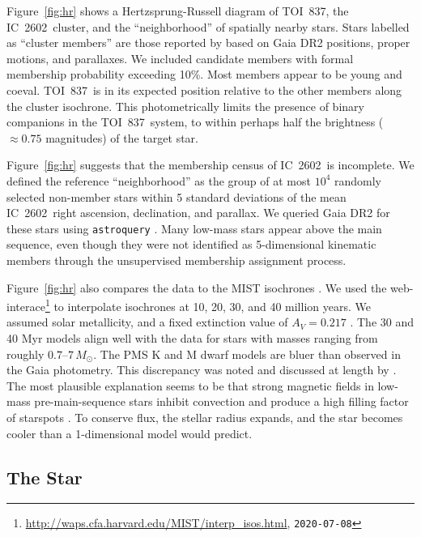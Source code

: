\documentclass[12pt,twocolumn,tighten]{aastex63}
\newcommand{\tn}{TOI~837} %
\newcommand{\cn}{IC~2602} %
\begin{document}
Figure~\ref{fig:hr} shows a Hertzsprung-Russell diagram of \tn, the
\cn\ cluster, and the ``neighborhood'' of spatially nearby stars.
Stars labelled as ``cluster members'' are those reported by
\citet{cantatgaudin_gaia_2018} based on Gaia DR2 positions, proper
motions, and parallaxes.  We included candidate members with formal
membership probability exceeding 10\%.  Most members appear to be
young and coeval.  \tn\ is in its expected position relative to the
other members along the cluster isochrone.  This photometrically
limits the presence of binary companions in the \tn\ system, to within
perhaps half the brightness ($\approx0.75$ magnitudes) of the target
star.

Figure~\ref{fig:hr} suggests that the membership census of \cn\ is
incomplete.  We defined the reference ``neighborhood'' as the group of
at most $10^4$ randomly selected non-member stars within 5 standard
deviations of the mean \cn\ right ascension, declination, and
parallax.  We queried Gaia DR2 for these stars using
\texttt{astroquery} \citep{astroquery_2018}.  Many low-mass stars
appear above the main sequence, even though they were not identified
as 5-dimensional kinematic members through the unsupervised
\citet{cantatgaudin_gaia_2018} membership assignment process.

Figure~\ref{fig:hr} also compares the data to the MIST isochrones
\citep{choi_mesa_2016}.  We used the
web-interace\footnote{\url{http://waps.cfa.harvard.edu/MIST/interp_isos.html},
\texttt{2020-07-08}} to interpolate isochrones at 10, 20, 30, and 40
million years. We assumed solar metallicity, and a fixed extinction
value of $A_V = 0.217$ \citep{randich_gaiaeso_2018}.  The 30 and 40
Myr models align well with the data for stars with masses ranging from
roughly $0.7$--$7\,M_\odot$.  The PMS K and M dwarf models are bluer
than observed in the Gaia photometry.  This discrepancy was noted and
discussed at length by \citet{choi_mesa_2016}.  The most plausible
explanation seems to be that strong magnetic fields in low-mass
pre-main-sequence stars inhibit convection and produce a high filling
factor of starspots \citep[{\it
e.g.},][]{stauffer_why_2003,feiden_magnetic_2013}. To conserve flux,
the stellar radius expands, and the star becomes cooler than a
1-dimensional model would predict.


\subsection{The Star}
\label{subsec:star}
\end{document}
